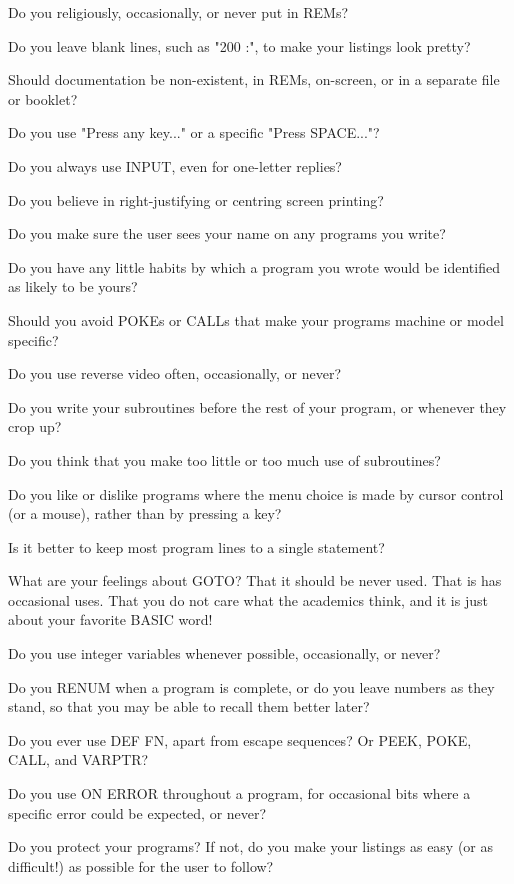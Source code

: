 Do you religiously, occasionally, or never put in REMs?

Do you leave blank lines, such as "200 :", to make your listings look pretty?

Should  documentation  be non-existent, in REMs, on-screen, or in  a  separate 
file or booklet?

Do you use "Press any key..." or a specific "Press SPACE..."?

Do you always use INPUT, even for one-letter replies?

Do you believe in right-justifying or centring screen printing?

Do you make sure the user sees your name on any programs you write?

Do you have any little habits by which a program you wrote would be identified 
as likely to be yours?

Should  you  avoid  POKEs or CALLs that make your programs  machine  or  model 
specific?

Do you use reverse video often, occasionally, or never?

Do  you  write your subroutines before the rest of your program,  or  whenever 
they crop up?

Do you think that you make too little or too much use of subroutines?

Do  you  like  or dislike programs where the menu choice  is  made  by  cursor 
control (or a mouse), rather than by pressing a key?

Is it better to keep most program lines to a single statement?

What  are your feelings about GOTO? That it should be never used. That is  has 
occasional uses. That you do not care what the academics think, and it is just 
about your favorite BASIC word!

Do you use integer variables whenever possible, occasionally, or never?

Do  you  RENUM  when a program is complete, or do you leave  numbers  as  they 
stand, so that you may be able to recall them better later?

Do you ever use DEF FN, apart from escape sequences? Or PEEK, POKE, CALL,  and 
VARPTR?

Do you use ON ERROR throughout a program, for occasional bits where a specific 
error could be expected, or never?

Do you protect your programs? If not, do you make your listings as easy (or as 
difficult!) as possible for the user to follow?

